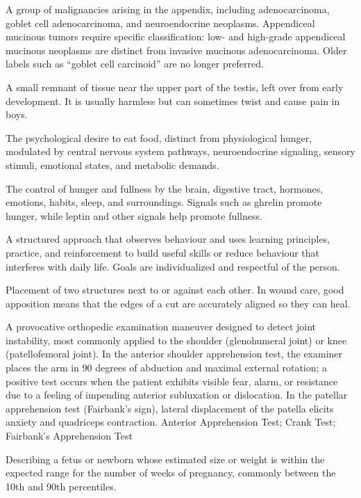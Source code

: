  A group of malignancies arising in the appendix, including adenocarcinoma, goblet cell adenocarcinoma,
and neuroendocrine neoplasms. Appendiceal mucinous tumors require specific classification:
low- and high-grade appendiceal mucinous neoplasms are distinct from invasive mucinous
adenocarcinoma. Older labels such as “goblet cell carcinoid” are no longer preferred.

 A small remnant of tissue near the upper part of the testis, left over from early development. It is usually harmless but can sometimes twist and cause pain in boys.

 The psychological desire to eat food, distinct from physiological hunger, modulated by central nervous system pathways, neuroendocrine signaling, sensory stimuli, emotional states, and metabolic demands.

 The control of hunger and fullness by the brain, digestive tract, hormones, emotions, habits, sleep, and surroundings. Signals such as ghrelin promote hunger, while leptin and other signals help promote fullness.

 A structured approach that observes behaviour and uses learning principles, practice, and reinforcement to build useful skills or reduce behaviour that interferes with daily life. Goals are individualized and respectful of the person.

 Placement of two structures next to or against each other. In wound care, good apposition means that the edges of a cut are accurately aligned so they can heal.

 A provocative orthopedic examination maneuver designed to detect joint instability, most commonly applied to the shoulder (glenohumeral joint) or knee (patellofemoral joint). In the anterior shoulder apprehension test, the examiner places the arm in 90 degrees of abduction and maximal external rotation; a positive test occurs when the patient exhibits visible fear, alarm, or resistance due to a feeling of impending anterior subluxation or dislocation. In the patellar apprehension test (Fairbank's sign), lateral displacement of the patella elicits anxiety and quadriceps contraction.
\synonyms
Anterior Apprehension Test; Crank Test; Fairbank's Apprehension Test

 Describing a fetus or newborn whose estimated size or weight is within the expected range for the number of weeks of pregnancy, commonly between the 10th and 90th percentiles.

